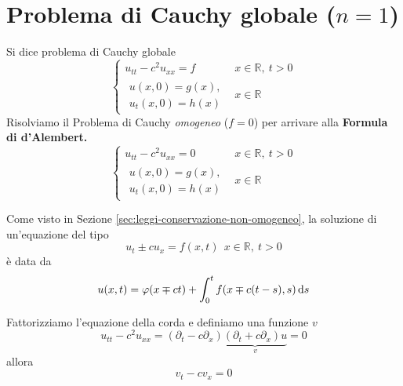 \section{Problema di Cauchy globale \texorpdfstring{($n=1$)}{(n=1)}}

Si dice problema di Cauchy globale
\begin{equation*}
    \begin{cases}
        u_{tt} -c^{2} u_{xx} =f     & x\in \mathbb{R} ,\ t >0 \\
        \begin{array}{l}
            u(x,0) =g(x) , \\
            u_{t}(x,0) =h(x)
        \end{array} & x\in \mathbb{R}
    \end{cases}
\end{equation*}
Risolviamo il Problema di Cauchy \textit{omogeneo} ($f=0$) per arrivare alla \textbf{Formula di d'Alembert.}
\begin{equation*}
    \begin{cases}
        u_{tt} -c^{2} u_{xx} =0     & x\in \mathbb{R} ,\ t >0 \\
        \begin{array}{l}
            u(x,0) =g(x) , \\
            u_{t}(x,0) =h(x)
        \end{array} & x\in \mathbb{R}
    \end{cases}
\end{equation*}
\begin{nb}
    Come visto in Sezione \ref{sec:leggi-conservazione-non-omogeneo}, la soluzione di un'equazione del tipo
    \begin{equation*}
        u_{t} \pm cu_{x} =f(x,t) \ \ x\in \mathbb{R} ,\ t >0
    \end{equation*}
    è data da
    \begin{equation}
        u(x,t) =\varphi (x\mp ct) +\int ^{t}_{0} f(x \mp c(t-s) ,s) \,\mathrm d s
        \label{eq:premessa-d-alembert}
    \end{equation}
\end{nb}
Fattorizziamo l'equazione della corda e definiamo una funzione $v$
\begin{equation*}
    u_{tt} -c^{2} u_{xx} =(\partial _{t} -c\partial _{x})\underbrace{(\partial _{t} +c\partial _{x}) u}_{v} =0
\end{equation*}
allora
\begin{equation*}
    v_{t} -cv_{x} =0
\end{equation*}
